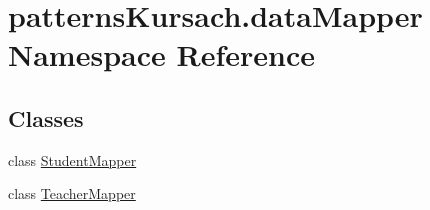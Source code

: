\hypertarget{namespacepatterns_kursach_1_1data_mapper}{}\section{patterns\+Kursach.\+data\+Mapper Namespace Reference}
\label{namespacepatterns_kursach_1_1data_mapper}
\subsection*{Classes}
\begin{DoxyCompactItemize}
\item 
class \mbox{\hyperlink{classpatterns_kursach_1_1data_mapper_1_1_student_mapper}{Student\+Mapper}}
\item 
class \mbox{\hyperlink{classpatterns_kursach_1_1data_mapper_1_1_teacher_mapper}{Teacher\+Mapper}}
\end{DoxyCompactItemize}
